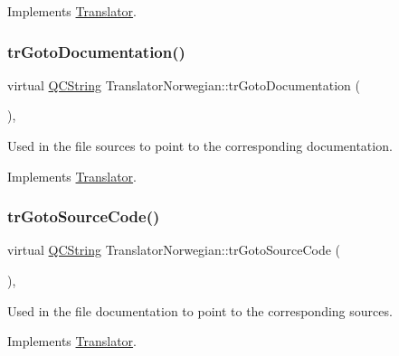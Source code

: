 Implements \mbox{\hyperlink{class_translator}{Translator}}.

\mbox{\label{class_translator_norwegian_a0dc5533adfc9908456985c664115e6a7}} 
\subsubsection{\texorpdfstring{trGotoDocumentation()}{trGotoDocumentation()}}
{\footnotesize\ttfamily virtual \mbox{\hyperlink{class_q_c_string}{Q\+C\+String}} Translator\+Norwegian\+::tr\+Goto\+Documentation (\begin{DoxyParamCaption}{ }\end{DoxyParamCaption})\hspace{0.3cm}{\ttfamily [inline]}, {\ttfamily [virtual]}}

Used in the file sources to point to the corresponding documentation. 

Implements \mbox{\hyperlink{class_translator}{Translator}}.

\mbox{\label{class_translator_norwegian_aa58b3c26f941088fa8c5d1d8d1f90d01}} 
\subsubsection{\texorpdfstring{trGotoSourceCode()}{trGotoSourceCode()}}
{\footnotesize\ttfamily virtual \mbox{\hyperlink{class_q_c_string}{Q\+C\+String}} Translator\+Norwegian\+::tr\+Goto\+Source\+Code (\begin{DoxyParamCaption}{ }\end{DoxyParamCaption})\hspace{0.3cm}{\ttfamily [inline]}, {\ttfamily [virtual]}}

Used in the file documentation to point to the corresponding sources. 

Implements \mbox{\hyperlink{class_translator}{Translator}}.

\mbox{\label{class_translator_norwegian_ae1755967842766f8fc246e1afd7964c2}} 
